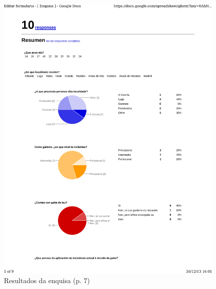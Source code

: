 \begin{figure}
 \centering
 \includegraphics[scale=0.7,page=7,keepaspectratio=true]{./imagenes/enquisa.pdf}
 \caption{Resultados da enquisa (p. 7)}
 \label{figura:ResultadosEnquisa7}
\end{figure}

